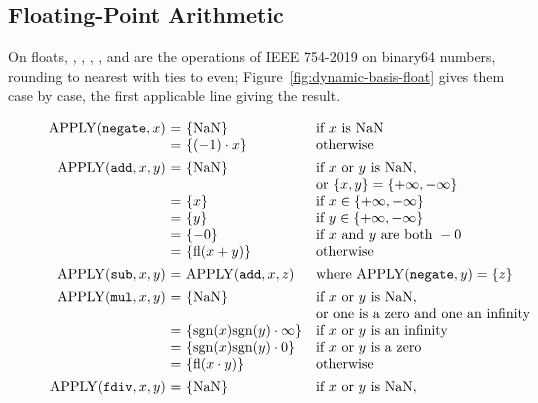 \subsection{Floating-Point Arithmetic}\label{sec:appendix-dynamic-basis-floatarith}

On floats, , , , ,  and
 are the operations of IEEE 754-2019 on binary64 numbers, rounding
to nearest with ties to even; Figure~\ref{fig:dynamic-basis-float} gives them
case by case, the first applicable line giving the result.

\begin{figure}[htbp]
\centering
\small
\[
\begin{array}{@{}r@{\ }c@{\ }l@{\quad}l@{}}
\APPLY(\kw{negate},x) & = & \{\dbNaN\} & \text{if}\ x\ \text{is}\ \dbNaN\\
                      & = & \{(-1)\cdot x\} & \text{otherwise}\\[1ex]
\APPLY(\kw{add},x,y) & = & \{\dbNaN\} & \text{if}\ x\ \text{or}\ y\ \text{is}\ \dbNaN,\\
                     &   &             & \text{or}\ \{x,y\}=\{+\infty,-\infty\}\\
                     & = & \{x\} & \text{if}\ x\in\{+\infty,-\infty\}\\
                     & = & \{y\} & \text{if}\ y\in\{+\infty,-\infty\}\\
                     & = & \{-0\} & \text{if}\ x\ \text{and}\ y\ \text{are both}\ -0\\
                     & = & \{\dbfl(x+y)\} & \text{otherwise}\\[1ex]
\APPLY(\kw{sub},x,y) & = & \APPLY(\kw{add},x,z) & \text{where}\ \APPLY(\kw{negate},y)=\{z\}\\[1ex]
\APPLY(\kw{mul},x,y) & = & \{\dbNaN\} & \text{if}\ x\ \text{or}\ y\ \text{is}\ \dbNaN,\\
                     &   &             & \text{or one is a zero and one an infinity}\\
                     & = & \{\dbsgn(x)\dbsgn(y)\cdot\infty\} & \text{if}\ x\ \text{or}\ y\ \text{is an infinity}\\
                     & = & \{\dbsgn(x)\dbsgn(y)\cdot 0\} & \text{if}\ x\ \text{or}\ y\ \text{is a zero}\\
                     & = & \{\dbfl(x\cdot y)\} & \text{otherwise}\\[1ex]
\APPLY(\kw{fdiv},x,y) & = & \{\dbNaN\} & \text{if}\ x\ \text{or}\ y\ \text{is}\ \dbNaN,\\

\end{array}\]
\end{figure}
